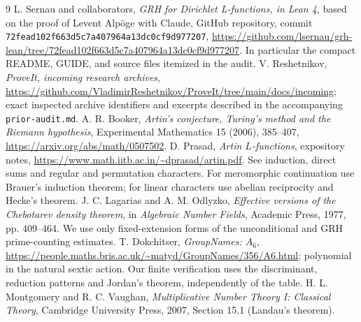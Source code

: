 \documentclass[11pt,letterpaper]{article}
\theoremstyle{remark}\newtheorem{remark}[theorem]{Remark}
\newcommand{\code}[1]{\nolinkurl{#1}}
\begin{document}
\begin{thebibliography}{9}
 L. Sernau and collaborators, \emph{GRH for Dirichlet L-functions, in Lean 4}, based on the proof of Levent Alp\"oge with Claude, GitHub repository, commit \nolinkurl{72fead102f663d5c7a407964a13dc0cf9d977207}, \url{https://github.com/lsernau/grh-lean/tree/72fead102f663d5c7a407964a13dc0cf9d977207}. In particular the compact README, GUIDE, and source files itemized in the audit.
 V. Reshetnikov, \emph{ProveIt, incoming research archives}, \url{https://github.com/VladimirReshetnikov/ProveIt/tree/main/docs/incoming}; exact inspected archive identifiers and excerpts described in the accompanying \code{prior-audit.md}.
 A. R. Booker, \emph{Artin's conjecture, Turing's method and the Riemann hypothesis}, Experimental Mathematics 15 (2006), 385--407, \url{https://arxiv.org/abs/math/0507502}.
 D. Prasad, \emph{Artin $L$-functions}, expository notes, \url{https://www.math.iitb.ac.in/~dprasad/artin.pdf}. See induction, direct sums and regular and permutation characters. For meromorphic continuation use Brauer's induction theorem; for linear characters use abelian reciprocity and Hecke's theorem.
 J. C. Lagarias and A. M. Odlyzko, \emph{Effective versions of the Chebotarev density theorem}, in \emph{Algebraic Number Fields}, Academic Press, 1977, pp. 409--464. We use only fixed-extension forms of the unconditional and GRH prime-counting estimates.
 T. Dokchitser, \emph{GroupNames: $A_6$}, \url{https://people.maths.bris.ac.uk/~matyd/GroupNames/356/A6.html}; polynomial in the natural sextic action. Our finite verification uses the discriminant, reduction patterns and Jordan's theorem, independently of the table.
 H. L. Montgomery and R. C. Vaughan, \emph{Multiplicative Number Theory I: Classical Theory}, Cambridge University Press, 2007, Section 15.1 (Landau's theorem).
\end{thebibliography}
\end{document}
